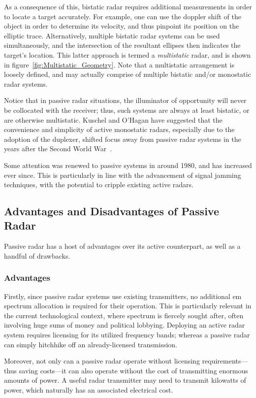 \documentclass[class=report,11pt,crop=false]{standalone}
\begin{document}
As a consequence of this, bistatic radar requires additional measurements in order to locate a target accurately. For example, one can use the doppler shift of the object in order to determine its velocity, and thus pinpoint its position on the elliptic trace. Alternatively, multiple bistatic radar systems can be used simultaneously, and the intersection of the resultant ellipses then indicates the target's location. This latter approach is termed a \emph{multistatic} radar, and is shown in figure~\ref{fig:Multistatic_Geometry}. Note that a multistatic arrangement is loosely defined, and may actually comprise of multiple bistatic and/or monostatic radar systems.

Notice that in passive radar situations, the illuminator of opportunity will never be collocated with the receiver; thus, such systems are always at least bistatic, or are otherwise multistatic. Kuschel and O'Hagan have suggested that the convenience and simplicity of active monostatic radars, especially due to the adoption of the duplexer, shifted focus away from passive radar systems in the years after the Second World War~\cite{kuschel-hagan-history}.

Some attention was renewed to passive systems in around 1980, and has increased ever since. This is particularly in line with the advancement of signal jamming techniques, with the potential to cripple existing active radars.

\subsection{Advantages and Disadvantages of Passive Radar}
Passive radar has a host of advantages over its active counterpart, as well as a handful of drawbacks.

\subsubsection{Advantages}
Firstly, since passive radar systems use existing transmitters, no additional \gls{em} spectrum allocation is required for their operation. This is particularly relevant in the current technological context, where spectrum is fiercely sought after, often involving huge sums of money and political lobbying. Deploying an active radar system requires licensing for its utilized frequency bands; whereas a passive radar can simply hitchhike off an already-licensed transmission.

Moreover, not only can a passive radar operate without licensing requirements---thus saving costs---it can also operate without the cost of transmitting enormous amounts of power. A useful radar transmitter may need to transmit kilowatts of power, which naturally has an associated electrical cost.
\end{document}
